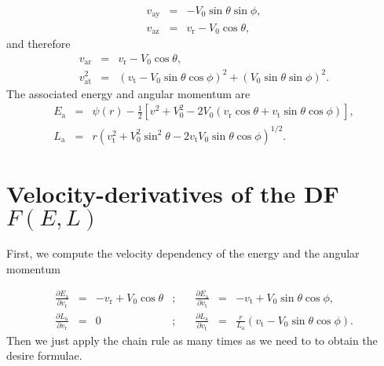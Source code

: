 \documentclass[11pt]{article}
\newcommand{\rt}{\mathrm{t}}
\newcommand{\rr}{\mathrm{r}}
\newcommand{\ry}{\mathrm{y}}
\newcommand{\rz}{\mathrm{z}}
\newcommand{\vr}{v_{\rr}}
\newcommand{\vt}{v_{\rt}}
\newcommand{\ra}{\mathrm{a}}
\newcommand{\vay}{v_{\ra \ry}}
\newcommand{\vaz}{v_{\ra \rz}}
\newcommand{\var}{v_{\ra \rr}}
\newcommand{\vat}{v_{\ra \rt}}
\newcommand{\Ea}{E_{\ra}}
\newcommand{\La}{L_{\ra}}
\begin{document}
\begin{appendices}
\begin{equation}
\begin{array}{ccl}
  \vay &=& \displaystyle{-V_{0}\sin\theta\sin\phi} , \\

  \vaz & =& \displaystyle{\vr - V_{0}\cos\theta} ,
\end{array}
\label{eq:va_coord}
\end{equation}
and therefore
\begin{equation}
  \begin{array}{ccl}
  \var & =&\displaystyle{\vr-V_{0}\cos\theta} ,\\

  \vat^{2} & =& \displaystyle{(\vt-V_{0}\sin\theta\cos\phi)^{2}+(V_{0}\sin\theta\sin\phi)^{2}} .
  \end{array}
  \label{eq:va_r_t}
\end{equation}
The associated energy and angular momentum are
\begin{equation}
  \begin{array}{ccl}
  \Ea & =&\displaystyle{\psi(r)-\frac{1}{2}\left[v^{2}+V_{0}^{2}-2V_{0}\left(\vr\cos\theta + \vt\sin\theta\cos\phi\right)\right]} ,\\

  \La & =& \displaystyle{r\left(\vt^{2}+V_{0}^{2}\sin^{2}\theta-2\vt V_{0}\sin\theta\cos\phi\right)^{1/2}} .
  \end{array}
  \label{eq:Ea_La}
\end{equation}

\section{Velocity-derivatives of the DF $F(E,L)$}
\label{app:fq_derivatives}

First, we compute the velocity dependency of the energy and the angular momentum

\begin{equation}
  \begin{array}{cclcccl}
  \displaystyle{\frac{\partial\Ea}{\partial \vr}} & =&\displaystyle{-\vr + V_{0} \cos\theta}&;\quad&  \displaystyle{\frac{\partial\Ea}{\partial \vt}} & =&\displaystyle{-\vt + V_{0}\sin\theta \cos\phi},\\

  \displaystyle{\frac{\partial\La}{\partial \vr}} & =&\displaystyle{
    0}&;\quad&  \displaystyle{\frac{\partial\La}{\partial \vt}} & =&\displaystyle{\frac{r}{\La} (\vt-V_{0}\sin\theta\cos\phi)} .
 
  \end{array}
  \label{eq:Ea_La}
\end{equation}
Then we just apply the chain rule as many times as we need to to obtain the desire formulae.


\end{appendices}
\end{document}

